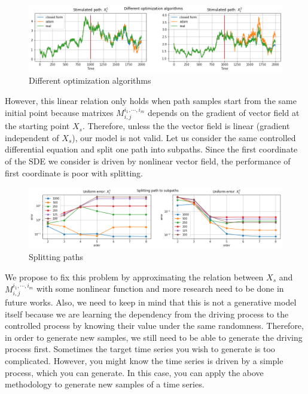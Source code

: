 \documentclass[12pt]{report}
\theoremstyle{definition}
\theoremstyle{remark}
\begin{document}
\begin{figure}[H]
  \centering
  \includegraphics[width=\textwidth]{figs/res6.png}
  \caption{Different optimization algorithms}
\end{figure}
However, this linear relation only holds when path samples start from the same initial point because matrixes $M^{i_{1},\cdots,i_{m}}_{i,j}$ depends on the gradient of vector field at the starting point $X_{s}$. Therefore, unless the the vector field is linear (gradient independent of $X_{s}$), our model is not valid. Let us consider the same controlled differential equation and split one path into subpaths. Since the first coordinate of the SDE we consider is driven by nonlinear vector field, the performance of first coordinate is poor with splitting.
\begin{figure}[H]
  \centering
  \includegraphics[width=\textwidth]{figs/res7.png}
  \caption{Splitting paths}
\end{figure}
We propose to fix this problem by approximating the relation between $X_{s}$ and $M^{i_{1},\cdots,i_{m}}_{i,j}$ with some nonlinear function and more research need to be done in future works. Also, we need to keep in mind that this is not a generative model itself because we are learning the dependency from the driving process to the controlled process by knowing their value under the same randomness. Therefore, in order to generate new samples, we still need to be able to generate the driving process first. Sometimes the target time series you wish to generate is too complicated. However, you might know the time series is driven by a simple process, which you can generate. In this case, you can apply the above methodology to generate new samples of a time series.


\nocite{*}


\end{document}
